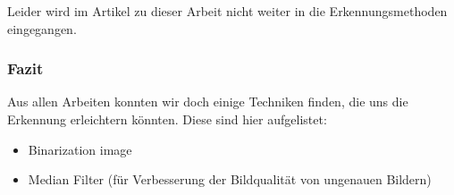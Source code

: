 Leider wird im Artikel zu dieser Arbeit nicht weiter in die Erkennungsmethoden eingegangen.

\subsubsection{Fazit}
Aus allen Arbeiten konnten wir doch einige Techniken finden, die uns die Erkennung erleichtern könnten. Diese sind hier aufgelistet:
\begin{itemize}
	\item Binarization image 
	\item Median Filter (für Verbesserung der Bildqualität von ungenauen Bildern)
\end{itemize}
